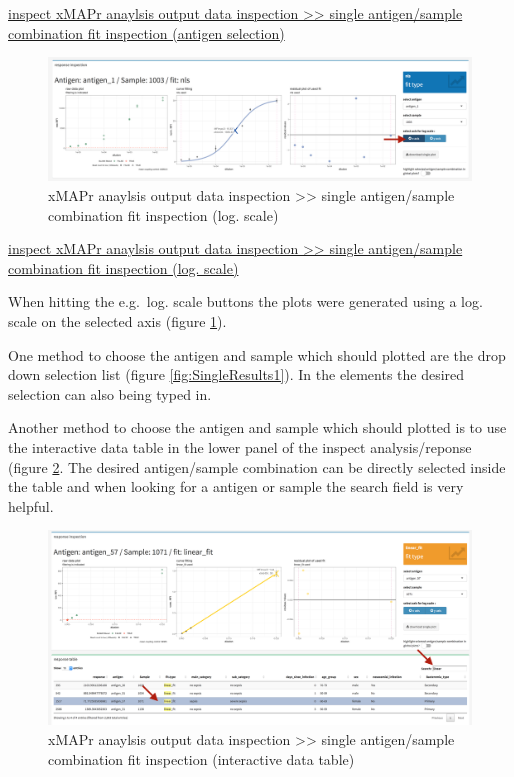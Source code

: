 \documentclass[]{book}
\theoremstyle{definition}
\theoremstyle{definition}
\theoremstyle{definition}
\theoremstyle{remark}
\begin{document}
\href{figures/inspect_single_results1.png}{inspect xMAPr anaylsis output
data inspection \textgreater{}\textgreater{} single antigen/sample
combination fit inspection (antigen selection)}

\begin{figure}
\includegraphics[width=54.97in]{figures/inspect_single_results2} \caption{xMAPr anaylsis output data inspection >> single antigen/sample combination fit inspection (log. scale)}\label{fig:SingleResults2}
\end{figure}

\href{figures/inspect_single_results2.png}{inspect xMAPr anaylsis output
data inspection \textgreater{}\textgreater{} single antigen/sample
combination fit inspection (log. scale)}

When hitting the e.g.~log. scale buttons the plots were generated using
a log. scale on the selected axis (figure \ref{fig:SingleResults2}).

One method to choose the antigen and sample which should plotted are the
drop down selection list (figure \ref{fig:SingleResults1}). In the
elements the desired selection can also being typed in.

Another method to choose the antigen and sample which should plotted is
to use the interactive data table in the lower panel of the inspect
analysis/reponse (figure \ref{fig:SingleResults3}. The desired
antigen/sample combination can be directly selected inside the table and
when looking for a antigen or sample the search field is very helpful.

\begin{figure}
\includegraphics[width=54.75in]{figures/inspect_single_results3} \caption{xMAPr anaylsis output data inspection >> single antigen/sample combination fit inspection (interactive data table)}\label{fig:SingleResults3}
\end{figure}
\end{document}
